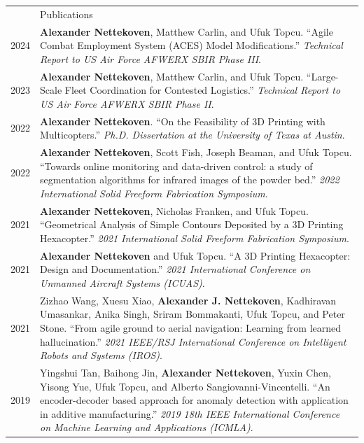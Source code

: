 \documentclass[letterpaper, 11pt]{article}
\newcommand{\headingfont}{\Large\color{CustomBlue}}
\newenvironment{SectionTable}[1]{
	\renewcommand*{\arraystretch}{1.3} %
	\setlength{\tabcolsep}{10pt}
	\begin{longtable}{Rp{4.9in}} & #1 \\}
{\end{longtable}}
\begin{document}
\begin{SectionTable}{\headingfont Publications}

2024 &
\textbf{Alexander Nettekoven}, Matthew Carlin, and Ufuk Topcu. ``Agile Combat Employment System (ACES) Model Modifications.'' \textit{Technical Report to US Air Force AFWERX SBIR Phase III}. \\

2023 &
\textbf{Alexander Nettekoven}, Matthew Carlin, and Ufuk Topcu. ``Large-Scale Fleet Coordination for Contested Logistics.'' \textit{Technical Report to US Air Force AFWERX SBIR Phase II}. \\

2022 &
\textbf{Alexander Nettekoven}. ``On the Feasibility of 3D Printing with Multicopters.'' \textit{Ph.D. Dissertation at the University of Texas at Austin}. \\

2022 &
\textbf{Alexander Nettekoven}, Scott Fish, Joseph Beaman, and Ufuk Topcu. ``Towards online monitoring and data-driven control: a study of segmentation algorithms for infrared images of the powder bed.'' \textit{2022 International Solid Freeform Fabrication Symposium}. \\

2021 &
\textbf{Alexander Nettekoven}, Nicholas Franken, and Ufuk Topcu. ``Geometrical Analysis of Simple Contours Deposited by a 3D Printing Hexacopter.'' \textit{2021 International Solid Freeform Fabrication Symposium}. \\

2021 &
\textbf{Alexander Nettekoven} and Ufuk Topcu. ``A 3D Printing Hexacopter: Design and Documentation.'' \textit{2021 International Conference on Unmanned Aircraft Systems (ICUAS)}. \\

2021 &
Zizhao Wang, Xuesu Xiao, \textbf{Alexander J. Nettekoven}, Kadhiravan Umasankar, Anika Singh, Sriram Bommakanti, Ufuk Topcu, and Peter Stone. ``From agile ground to aerial navigation: Learning from learned hallucination.'' \textit{2021 IEEE/RSJ International Conference on Intelligent Robots and Systems (IROS)}. \\

2019 &
Yingshui Tan, Baihong Jin, \textbf{Alexander Nettekoven}, Yuxin Chen, Yisong Yue, Ufuk Topcu, and Alberto Sangiovanni-Vincentelli. ``An encoder-decoder based approach for anomaly detection with application in additive manufacturing.'' \textit{2019 18th IEEE International Conference on Machine Learning and Applications (ICMLA)}. \\


\end{SectionTable}
\end{document}
